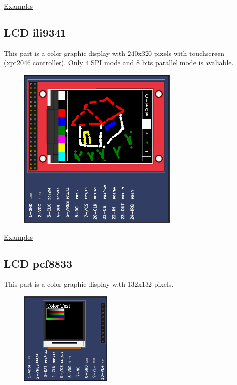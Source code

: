 \href{https://lcgamboa.github.io/picsimlab_examples/parts_LCD_hd44780.html}{Examples}

\vspace{0.5cm}

\subsection{LCD ili9341}

This part is a color graphic display with 240x320 pixels with touchscreen (xpt2046 controller).
Only 4 SPI mode and 8 bits parallel mode is avaliable.

\begin{figure}[H]
\center
\includegraphics[width=0.7\textwidth]{img/part_lcd_ili9341.png} 
\end{figure} 

\href{https://lcgamboa.github.io/picsimlab_examples/parts_LCD_ili9341.html}{Examples}

\vspace{0.5cm}

\vspace{0.5cm}


\subsection{LCD pcf8833}

This part is a color graphic display with 132x132 pixels.

\begin{figure}[H]
\center
\includegraphics[width=0.4\textwidth]{img/part_pcf8833.png} 
\end{figure} 

